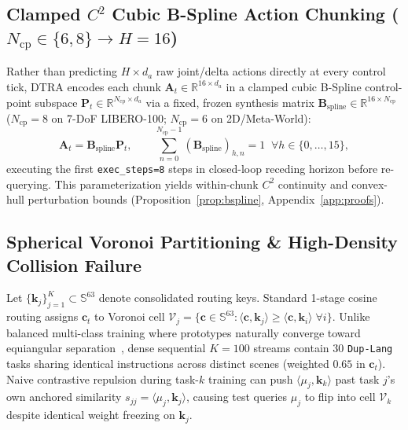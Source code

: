 \documentclass[10pt]{article}
\begin{document}
\subsection{Clamped \texorpdfstring{$C^2$}{C2} Cubic B-Spline Action Chunking (\texorpdfstring{$N_{\text{cp}} \in \{6,8\} \to H = 16$}{Ncp in 6,8 -> H=16})}
Rather than predicting $H \times d_a$ raw joint/delta actions directly at every control tick, DTRA encodes each chunk $\mathbf{A}_t \in \mathbb{R}^{16 \times d_a}$ in a clamped cubic B-Spline control-point subspace $\mathbf{P}_t \in \mathbb{R}^{N_{\text{cp}} \times d_a}$ via a fixed, frozen synthesis matrix $\mathbf{B}_{\text{spline}} \in \mathbb{R}^{16 \times N_{\text{cp}}}$ ($N_{\text{cp}}=8$ on 7-DoF LIBERO-100; $N_{\text{cp}}=6$ on 2D/Meta-World):
\begin{equation}
  \mathbf{A}_t = \mathbf{B}_{\text{spline}} \mathbf{P}_t, \qquad \sum_{n=0}^{N_{\text{cp}}-1} (\mathbf{B}_{\text{spline}})_{h,n} = 1 \;\; \forall h \in \{0,\dots,15\},
\end{equation}
executing the first \texttt{exec\_steps=8} steps in closed-loop receding horizon before re-querying. This parameterization yields within-chunk $C^2$ continuity and convex-hull perturbation bounds (Proposition~\ref{prop:bspline}, Appendix~\ref{app:proofs}).

\subsection{Spherical Voronoi Partitioning \& High-Density Collision Failure}
Let $\{\mathbf{k}_j\}_{j=1}^{K} \subset \mathbb{S}^{63}$ denote consolidated routing keys. Standard 1-stage cosine routing assigns $\mathbf{c}_t$ to Voronoi cell $\mathcal{V}_j = \{\mathbf{c} \in \mathbb{S}^{63} : \langle \mathbf{c}, \mathbf{k}_j \rangle \ge \langle \mathbf{c}, \mathbf{k}_i \rangle \;\forall i\}$. Unlike balanced multi-class training where prototypes naturally converge toward equiangular separation~\cite{papyan2020neural}, dense sequential $K=100$ streams contain $30$ \texttt{Dup-Lang} tasks sharing identical instructions across distinct scenes (weighted $0.65$ in $\mathbf{c}_t$). Naive contrastive repulsion during task-$k$ training can push $\langle \mu_j, \mathbf{k}_k \rangle$ past task $j$'s own anchored similarity $s_{jj} = \langle \mu_j, \mathbf{k}_j \rangle$, causing test queries $\mu_j$ to flip into cell $\mathcal{V}_k$ despite identical weight freezing on $\mathbf{k}_j$.

\end{document}
